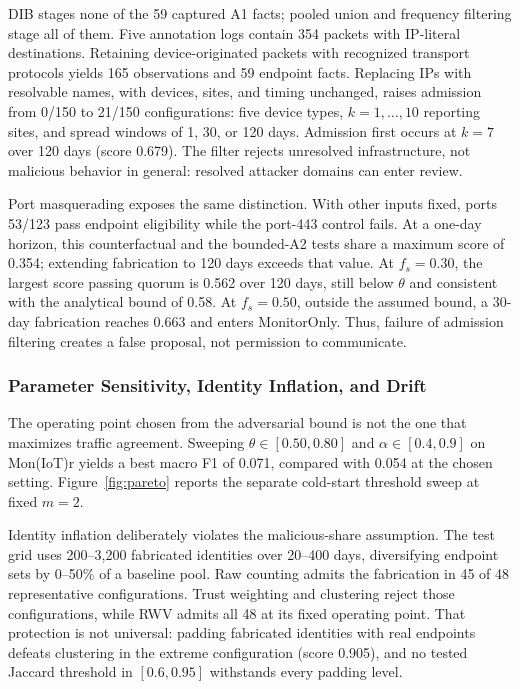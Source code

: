 \documentclass[journal]{IEEEtran}
\theoremstyle{definition}
\begin{document}
DIB stages none of the 59 captured A1 facts; pooled union and frequency filtering stage all of them. Five annotation logs contain 354 packets with IP-literal destinations. Retaining device-originated packets with recognized transport protocols yields 165 observations and 59 endpoint facts. Replacing IPs with resolvable names, with devices, sites, and timing unchanged, raises admission from 0/150 to 21/150 configurations: five device types, $k=1,\ldots,10$ reporting sites, and spread windows of 1, 30, or 120 days. Admission first occurs at $k=7$ over 120 days (score 0.679). The filter rejects unresolved infrastructure, not malicious behavior in general: resolved attacker domains can enter review.

Port masquerading exposes the same distinction. With other inputs fixed, ports 53/123 pass endpoint eligibility while the port-443 control fails. At a one-day horizon, this counterfactual and the bounded-A2 tests share a maximum score of 0.354; extending fabrication to 120 days exceeds that value. At $f_s=0.30$, the largest score passing quorum is 0.562 over 120 days, still below $\theta$ and consistent with the analytical bound of 0.58. At $f_s=0.50$, outside the assumed bound, a 30-day fabrication reaches 0.663 and enters MonitorOnly. Thus, failure of admission filtering creates a false proposal, not permission to communicate.

\subsubsection{Parameter Sensitivity, Identity Inflation, and Drift}
\label{sec:sensitivity-results}
The operating point chosen from the adversarial bound is not the one that maximizes traffic agreement. Sweeping $\theta\in[0.50,0.80]$ and $\alpha\in[0.4,0.9]$ on Mon(IoT)r yields a best macro F1 of 0.071, compared with 0.054 at the chosen setting. Figure~\ref{fig:pareto} reports the separate cold-start threshold sweep at fixed $m=2$.

Identity inflation deliberately violates the malicious-share assumption. The test grid uses 200--3,200 fabricated identities over 20--400 days, diversifying endpoint sets by 0--50\% of a baseline pool. Raw counting admits the fabrication in 45 of 48 representative configurations. Trust weighting and clustering reject those configurations, while RWV admits all 48 at its fixed operating point. That protection is not universal: padding fabricated identities with real endpoints defeats clustering in the extreme configuration (score 0.905), and no tested Jaccard threshold in $[0.6,0.95]$ withstands every padding level.
\end{document}

